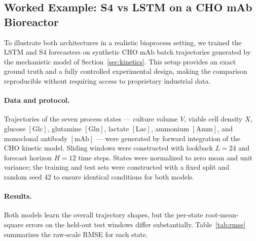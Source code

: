 \subsection{Worked Example: S4 vs LSTM on a CHO mAb Bioreactor}
\label{sec:dl_example}

To illustrate both architectures in a realistic bioprocess setting, we trained
the LSTM and S4 forecasters on synthetic CHO mAb batch trajectories generated
by the mechanistic model of Section~\ref{sec:kinetics}.  This setup provides
an exact ground truth and a fully controlled experimental design, making the
comparison reproducible without requiring access to proprietary industrial
data.

\paragraph{Data and protocol.}
Trajectories of the seven process states --- culture volume $V$, viable cell
density $X$, glucose $[\mathrm{Glc}]$, glutamine $[\mathrm{Gln}]$, lactate
$[\mathrm{Lac}]$, ammonium $[\mathrm{Amm}]$, and monoclonal antibody
$[\mathrm{mAb}]$ --- were generated by forward integration of the CHO kinetic
model.  Sliding windows were constructed with lookback $L = 24$ and forecast
horizon $H = 12$ time steps.  States were normalized to zero mean and unit
variance; the training and test sets were constructed with a fixed split and
random seed 42 to ensure identical conditions for both models.

\paragraph{Results.}
Both models learn the overall trajectory shapes, but the per-state root-mean-square
errors on the held-out test windows differ substantially.  Table~\ref{tab:rmse}
summarizes the raw-scale RMSE for each state.


